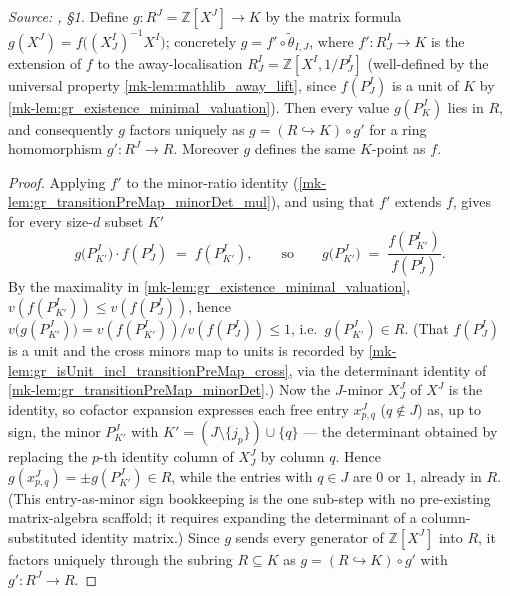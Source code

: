 \begin{lemma}\label{mk-lem:gr_existence_factor_through_valuation_ring}
  \leanok

  \textit{Source: \cite{nitsure-hilbert-quot}, \S 1.}
  Define \(g : R^J = \mathbb{Z}[X^J] \to K\) by the matrix formula \(g(X^J) =
  f\bigl((X^I_J)^{-1} X^I\bigr)\); concretely \(g = f' \circ \tilde\theta_{I,J}\),
  where \(f' : R^I_J \to K\) is the extension of \(f\) to the away-localisation
  \(R^I_J = \mathbb{Z}[X^I, 1/P^I_J]\) (well-defined by the universal property
  \ref{mk-lem:mathlib_away_lift}, since \(f(P^I_J)\) is a unit of \(K\) by
  \ref{mk-lem:gr_existence_minimal_valuation}). Then every value \(g(P^J_K)\) lies in
  \(R\), and consequently \(g\) factors uniquely as \(g = (R \hookrightarrow K)
  \circ g'\) for a ring homomorphism \(g' : R^J \to R\). Moreover \(g\) defines the
  same \(K\)-point as \(f\).
\end{lemma}
\begin{proof}
  \leanok
    Applying \(f'\) to the minor-ratio identity
  (\ref{mk-lem:gr_transitionPreMap_minorDet_mul}), and using that \(f'\) extends
  \(f\), gives for every size-\(d\) subset \(K'\)
  \[
    g\bigl(P^J_{K'}\bigr)\cdot f(P^I_J) \;=\; f(P^I_{K'}),
    \qquad\text{so}\qquad
    g\bigl(P^J_{K'}\bigr) \;=\; \frac{f(P^I_{K'})}{f(P^I_J)} .
  \]
  By the maximality in \ref{mk-lem:gr_existence_minimal_valuation},
  \(v(f(P^I_{K'})) \le v(f(P^I_J))\), hence \(v\bigl(g(P^J_{K'})\bigr) =
  v(f(P^I_{K'}))/v(f(P^I_J)) \le 1\), i.e.\ \(g(P^J_{K'}) \in R\). (That
  \(f(P^I_J)\) is a unit and the cross minors map to units is recorded by
  \ref{mk-lem:gr_isUnit_incl_transitionPreMap_cross}, via the determinant identity of
  \ref{mk-lem:gr_transitionPreMap_minorDet}.) Now the \(J\)-minor \(X^J_J\) of \(X^J\)
  is the identity, so cofactor expansion expresses each free entry \(x^J_{p,q}\)
  (\(q \notin J\)) as, up to sign, the minor \(P^J_{K'}\) with \(K' = (J \setminus
  \{j_p\}) \cup \{q\}\) --- the determinant obtained by replacing the \(p\)-th
  identity column of \(X^J_J\) by column \(q\). Hence \(g(x^J_{p,q}) = \pm
  g(P^J_{K'}) \in R\), while the entries with \(q \in J\) are \(0\) or \(1\),
  already in \(R\). (This entry-as-minor sign bookkeeping is the one sub-step with
  no pre-existing matrix-algebra scaffold; it requires expanding the determinant of
  a column-substituted identity matrix.) Since \(g\) sends every generator of
  \(\mathbb{Z}[X^J]\) into \(R\), it factors uniquely through the subring \(R
  \subseteq K\) as \(g = (R \hookrightarrow K) \circ g'\) with \(g' : R^J \to R\).
\end{proof}


